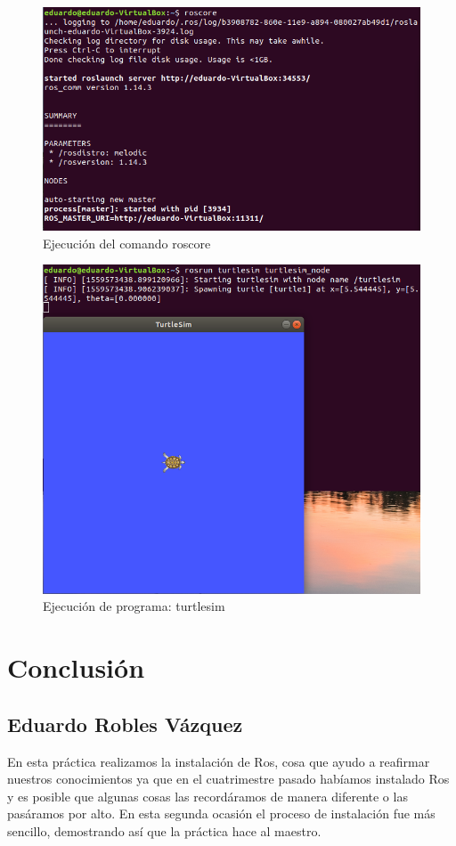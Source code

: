 \documentclass[11pt,a4paper,oldfontcommands,oneside]{memoir}
\begin{document}
\begin{figure}[h]
	\includegraphics[scale=.75]{link21.png}
	\caption{Ejecución del comando roscore}
	\label{roscore1}
\end{figure}

\begin{figure}[h]
\includegraphics[scale=.75]{link23.png}
\caption{Ejecución de programa: turtlesim}
	\label{roscore2}
\end{figure}
\vspace{2cm}
\hfill

\chapter{Conclusión }
\section{Eduardo Robles Vázquez }
En esta práctica realizamos la instalación de Ros, cosa que ayudo a reafirmar nuestros conocimientos ya que en el cuatrimestre pasado habíamos instalado Ros y es posible que algunas cosas las recordáramos de manera diferente o las pasáramos por alto. En esta segunda ocasión el proceso de instalación fue más sencillo, demostrando así que la práctica hace al maestro. 

\vspace{2cm}
\hfill


\end{document}
